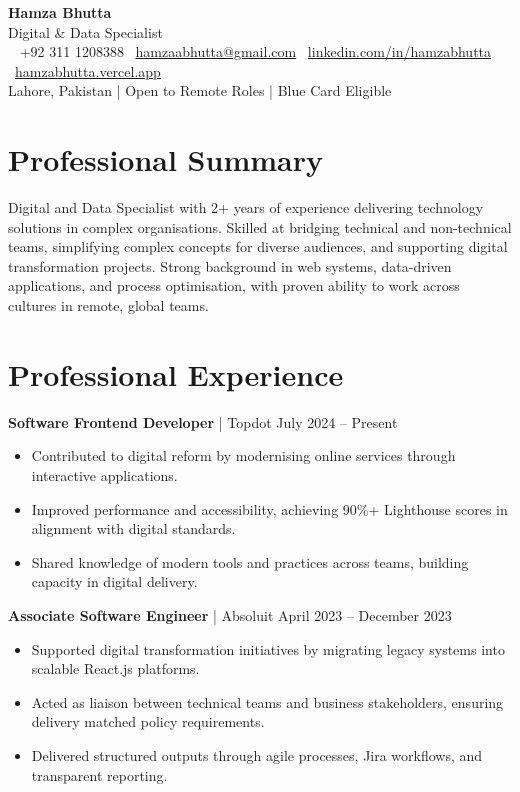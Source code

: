 \documentclass[10pt]{article}
\makeatletter
\newcommand{\headerfontsize}{\Large}
\newcommand{\bodyfontsize}{\small}
\newcommand{\resumeHeader}[1]{
    \begin{center}
        {\headerfontsize\bfseries\color{headercolor} Hamza Bhutta} \\[2pt]
        {\normalsize\color{headercolor} Digital \& Data Specialist} \\[4pt]
        {\bodyfontsize\color{headercolor}
            \faPhone~ +92 311 1208388 \quad
            \faEnvelope~\href{mailto:hamzaabhutta@gmail.com}{hamzaabhutta@gmail.com} \quad
            \faLinkedin~\href{https://www.linkedin.com/in/hamzabhutta}{linkedin.com/in/hamzabhutta} \quad
            \faGlobe~\href{https://hamzabhutta.vercel.app/}{hamzabhutta.vercel.app}
        } \\[3pt]
        {\bodyfontsize\color{headercolor} Lahore, Pakistan | Open to Remote Roles | Blue Card Eligible}
        \vspace{6pt}
    \end{center}
}
\makeatother
\begin{document}
\pagestyle{empty}

\setlength{\parindent}{0pt}

\resumeHeader{}

\section{Professional Summary}
\bodyfontsize
Digital and Data Specialist with 2+ years of experience delivering technology solutions in complex organisations. Skilled at bridging technical and non-technical teams, simplifying complex concepts for diverse audiences, and supporting digital transformation projects. Strong background in web systems, data-driven applications, and process optimisation, with proven ability to work across cultures in remote, global teams.

\section{Professional Experience}

\textbf{Software Frontend Developer} | Topdot \hfill July 2024 -- Present
\begin{itemize}
\item Contributed to digital reform by modernising online services through interactive applications.
\item Improved performance and accessibility, achieving 90\%+ Lighthouse scores in alignment with digital standards.
\item Shared knowledge of modern tools and practices across teams, building capacity in digital delivery.
\end{itemize}

\textbf{Associate Software Engineer} | Absoluit \hfill April 2023 – December 2023
\begin{itemize}
\item Supported digital transformation initiatives by migrating legacy systems into scalable React.js platforms.
\item Acted as liaison between technical teams and business stakeholders, ensuring delivery matched policy requirements.
\item Delivered structured outputs through agile processes, Jira workflows, and transparent reporting.
\end{itemize}
\end{document}
